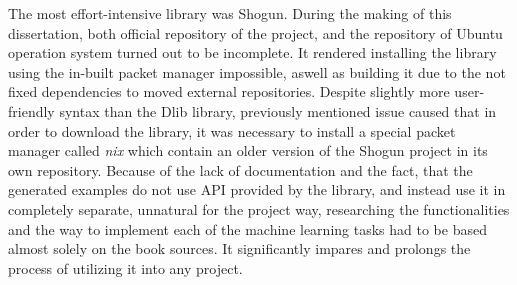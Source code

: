 The most effort-intensive library was Shogun. During the making of this dissertation, both official repository of the project, and the repository of Ubuntu operation system turned out to be incomplete. It rendered installing the library using the in-built packet manager impossible, aswell as building it due to the not fixed dependencies to moved external repositories. Despite slightly more user-friendly syntax than the Dlib library, previously mentioned issue caused that in order to download the library, it was necessary to install a special packet manager called \textit{nix} which contain an older version of the Shogun project in its own repository. Because of the lack of documentation and the fact, that the generated examples do not use API provided by the library, and instead use it in completely separate, unnatural for the project way, researching the functionalities and the way to implement each of the machine learning tasks had to be based almost solely on the book sources. It significantly impares and prolongs the process of utilizing it into any project.